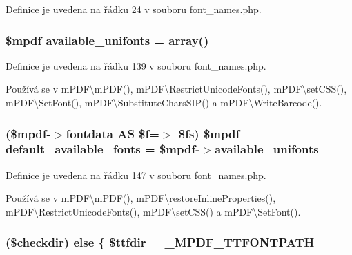 Definice je uvedena na řádku 24 v souboru font\-\_\-names.\-php.

\hypertarget{font__names_8php_a049dd680083527692e7216f4666de169}{
\subsubsection[{available\-\_\-unifonts}]{\setlength{\rightskip}{0pt plus 5cm}\$mpdf available\-\_\-unifonts = array()}}\label{font__names_8php_a049dd680083527692e7216f4666de169}


Definice je uvedena na řádku 139 v souboru font\-\_\-names.\-php.



Používá se v m\-P\-D\-F\textbackslash{}m\-P\-D\-F(), m\-P\-D\-F\textbackslash{}\-Restrict\-Unicode\-Fonts(), m\-P\-D\-F\textbackslash{}set\-C\-S\-S(), m\-P\-D\-F\textbackslash{}\-Set\-Font(), m\-P\-D\-F\textbackslash{}\-Substitute\-Chars\-S\-I\-P() a m\-P\-D\-F\textbackslash{}\-Write\-Barcode().

\hypertarget{font__names_8php_ac88c4b786b90f81858dc8ceef22bb037}{
\subsubsection[{default\-\_\-available\-\_\-fonts}]{ (\$mpdf-\/$>${\bf fontdata} A\-S \$f=$>$ \$fs) \$mpdf default\-\_\-available\-\_\-fonts = \$mpdf-\/$>${\bf available\-\_\-unifonts}}}\label{font__names_8php_ac88c4b786b90f81858dc8ceef22bb037}


Definice je uvedena na řádku 147 v souboru font\-\_\-names.\-php.



Používá se v m\-P\-D\-F\textbackslash{}m\-P\-D\-F(), m\-P\-D\-F\textbackslash{}restore\-Inline\-Properties(), m\-P\-D\-F\textbackslash{}\-Restrict\-Unicode\-Fonts(), m\-P\-D\-F\textbackslash{}set\-C\-S\-S() a m\-P\-D\-F\textbackslash{}\-Set\-Font().

\hypertarget{font__names_8php_a5271a2344cca2dc08862484f40ba9273}{
\subsubsection[{else}]{ (\$checkdir) else \{ \$ttfdir = \-\_\-\-M\-P\-D\-F\-\_\-\-T\-T\-F\-O\-N\-T\-P\-A\-T\-H}}\label{font__names_8php_a5271a2344cca2dc08862484f40ba9273}


